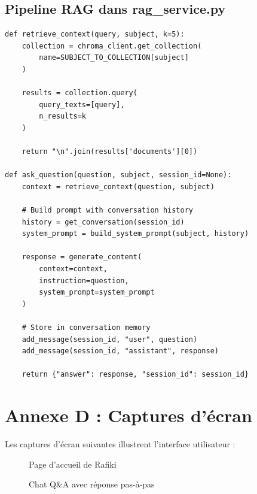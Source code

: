 \documentclass[12pt,a4paper]{report}
\begin{document}
\subsection{Pipeline RAG dans rag\_service.py}
\begin{lstlisting}
def retrieve_context(query, subject, k=5):
    collection = chroma_client.get_collection(
        name=SUBJECT_TO_COLLECTION[subject]
    )

    results = collection.query(
        query_texts=[query],
        n_results=k
    )

    return "\n".join(results['documents'][0])

def ask_question(question, subject, session_id=None):
    context = retrieve_context(question, subject)

    # Build prompt with conversation history
    history = get_conversation(session_id)
    system_prompt = build_system_prompt(subject, history)

    response = generate_content(
        context=context,
        instruction=question,
        system_prompt=system_prompt
    )

    # Store in conversation memory
    add_message(session_id, "user", question)
    add_message(session_id, "assistant", response)

    return {"answer": response, "session_id": session_id}
\end{lstlisting}

\section{Annexe D : Captures d'écran}
Les captures d'écran suivantes illustrent l'interface utilisateur :

\begin{figure}[h!]
    \centering
    \caption{Page d'accueil de Rafiki}
    \label{fig:landing}
\end{figure}

\begin{figure}[h!]
    \centering
    \caption{Chat Q\&A avec réponse pas-à-pas}
    \label{fig:chat}
\end{figure}
\end{document}

